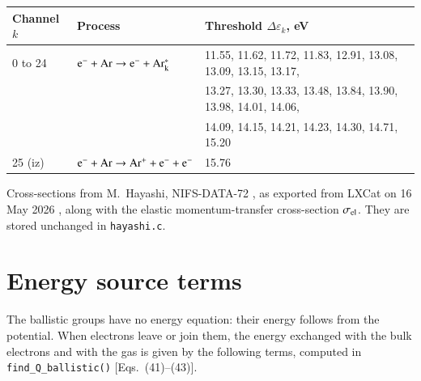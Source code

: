 \documentclass{warpdoc}
\renewcommand{\fontsizetable}{\footnotesize}
\begin{document}
\begin{table}[!ht]
  \center\fontsizetable
  \begin{threeparttable}
    \label{tab:hayashi}
    \fontsizetable
    \begin{tabular*}{0.95\textwidth}{@{}l@{\extracolsep{\fill}}ll@{}}
    \toprule
    Channel $k$ & Process & Threshold $\Delta\varepsilon_k$, eV\\
    \midrule
    0 to 24 & $\rm e^- + Ar \rightarrow e^- + Ar^*_k$ & 11.55, 11.62, 11.72, 11.83, 12.91, 13.08, 13.09, 13.15, 13.17,\\
            & & 13.27, 13.30, 13.33, 13.48, 13.84, 13.90, 13.98, 14.01, 14.06,\\
            & & 14.09, 14.15, 14.21, 14.23, 14.30, 14.71, 15.20\\
    25 (iz) & $\rm e^- + Ar \rightarrow Ar^+ + e^- + e^-$ & 15.76\\
    \bottomrule
    \end{tabular*}
\begin{tablenotes}
\item[{a}] Cross-sections from M.~Hayashi, NIFS-DATA-72 \cite{nifs:2003:hayashi}, as exported from LXCat on 16 May 2026 \cite{lxcat:hayashi}, along with the elastic momentum-transfer cross-section $\sigma_{\rm el}$. They are stored unchanged in {\tt hayashi.c}.
\end{tablenotes}
   \end{threeparttable}
\end{table}


\section{Energy source terms}

The ballistic groups have no energy equation: their energy follows from the potential. When electrons leave or join them, the energy exchanged with the bulk electrons and with the gas is given by the following terms, computed in {\tt find\_Q\_ballistic()} [Eqs.~(41)--(43)].
\end{document}
